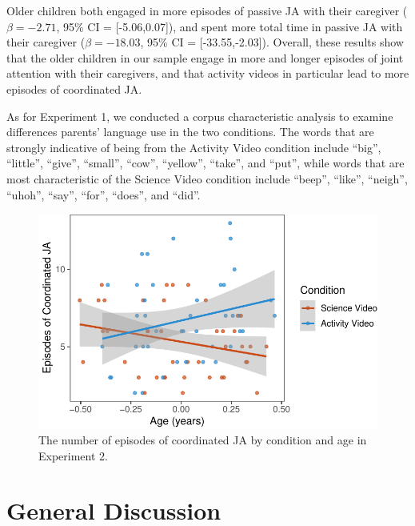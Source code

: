 \documentclass[man,floatsintext]{apa6}
\begin{document}
Older children both engaged in more episodes of passive JA with their caregiver (\(\beta=-2.71\), 95\% CI = {[}-5.06,0.07{]}), and spent more total time in passive JA with their caregiver (\(\beta=-18.03\), 95\% CI = {[}-33.55,-2.03{]}).
Overall, these results show that the older children in our sample engage in more and longer episodes of joint attention with their caregivers, and that activity videos in particular lead to more episodes of coordinated JA.

As for Experiment 1, we conducted a corpus characteristic analysis to examine differences parents' language use in the two conditions.
The words that are strongly indicative of being from the Activity Video condition include \enquote{big}, \enquote{little}, \enquote{give}, \enquote{small}, \enquote{cow}, \enquote{yellow}, \enquote{take}, and \enquote{put}, while words that are most characteristic of the Science Video condition include \enquote{beep}, \enquote{like}, \enquote{neigh}, \enquote{uhoh}, \enquote{say}, \enquote{for}, \enquote{does}, and \enquote{did}.

\begin{figure}[H]

{\centering \includegraphics{figs/e2ja-coord-1} 

}

\caption{The number of episodes of coordinated JA by condition and age in Experiment 2.}\label{fig:e2ja-coord}
\end{figure}

\hypertarget{general-discussion}{%
\section{General Discussion}\label{general-discussion}}
\end{document}
